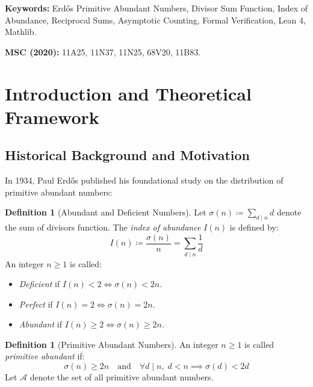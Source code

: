 \documentclass[11pt,a4paper]{article}
\theoremstyle{definition}
\newtheorem{definition}[theorem]{Definition}
\begin{document}
\vspace{0.5em}
\noindent\textbf{Keywords:} Erd\H{o}s Primitive Abundant Numbers, Divisor Sum Function, Index of Abundance, Reciprocal Sums, Asymptotic Counting, Formal Verification, Lean 4, Mathlib.

\noindent\textbf{MSC (2020):} 11A25, 11N37, 11N25, 68V20, 11B83.

\tableofcontents
\newpage

\section{Introduction and Theoretical Framework}

\subsection{Historical Background and Motivation}
In 1934, Paul Erd\H{o}s \cite{erdos1934} published his foundational study on the distribution of primitive abundant numbers:

\begin{definition}[Abundant and Deficient Numbers]\label{def:abundant}
Let $\sigma(n) \coloneqq \sum_{d \mid n} d$ denote the sum of divisors function.
The \emph{index of abundance} $I(n)$ is defined by:
\begin{equation}\label{eq:abundance_index}
I(n) \coloneqq \frac{\sigma(n)}{n} = \sum_{d \mid n} \frac{1}{d}
\end{equation}
An integer $n \ge 1$ is called:
\begin{itemize}
    \item \emph{Deficient} if $I(n) < 2 \iff \sigma(n) < 2n$.
    \item \emph{Perfect} if $I(n) = 2 \iff \sigma(n) = 2n$.
    \item \emph{Abundant} if $I(n) \ge 2 \iff \sigma(n) \ge 2n$.
\end{itemize}
\end{definition}

\begin{definition}[Primitive Abundant Numbers]\label{def:primitive_abundant}
An integer $n \ge 1$ is called \emph{primitive abundant} if:
\begin{equation}\label{eq:prim_abundant_def}
\sigma(n) \ge 2n \quad \text{and} \quad \forall d \mid n, \; d < n \implies \sigma(d) < 2d
\end{equation}
Let $\mathcal{A}$ denote the set of all primitive abundant numbers.
\end{definition}
\end{document}
